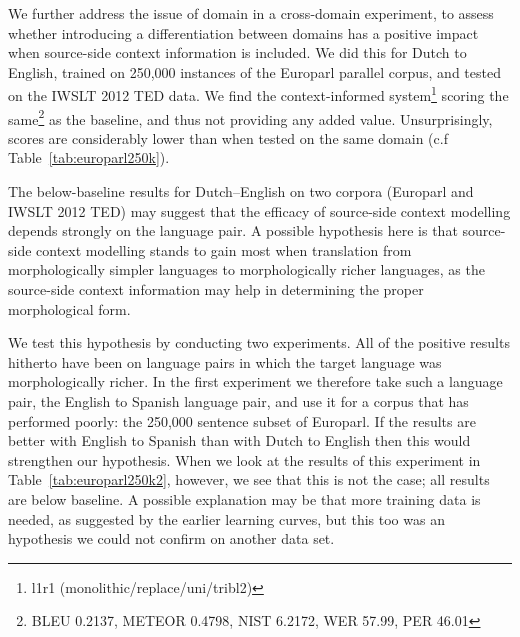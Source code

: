 \documentclass[smallextended]{svjour3}       %
\theoremstyle{break}
\begin{document}
We further address the issue of domain in a cross-domain experiment, to assess
whether introducing a differentiation between domains has a positive impact
when source-side context information is included. We did this for Dutch to
English, trained on 250,000 instances of the Europarl parallel corpus, and
tested on the IWSLT 2012 TED data. We find the context-informed
system\footnote{l1r1 (monolithic/replace/uni/tribl2)} scoring the
same\footnote{BLEU 0.2137, METEOR 0.4798, NIST 6.2172, WER 57.99, PER 46.01} as
the baseline, and thus not providing any added value. Unsurprisingly, scores
are considerably lower than when tested on the same domain (c.f
Table~\ref{tab:europarl250k}).

The below-baseline results for Dutch--English on two corpora (Europarl and IWSLT
2012 TED) may suggest that the efficacy of source-side context modelling
depends strongly on the language pair. A possible hypothesis here is that
source-side context modelling stands to gain most when translation from
morphologically simpler languages to morphologically richer languages, as the
source-side context information may help in determining the proper
morphological form. 

We test this hypothesis by conducting two experiments. All of the positive
results hitherto have been on language pairs in which the target language was
morphologically richer.  In the first experiment we therefore take such a
language pair, the English to Spanish language pair, and use it for a corpus
that has performed poorly: the 250,000 sentence subset of Europarl.  If the
results are better with English to Spanish than with Dutch to English
then this would strengthen our hypothesis. When we look at the results of
this experiment in Table~\ref{tab:europarl250k2}, however, we see
that this is not the case; all results are below baseline. A possible
explanation may be that more training data is needed, as suggested by the
earlier learning curves, but this too was an hypothesis we could not confirm on
another data set.
\end{document}
